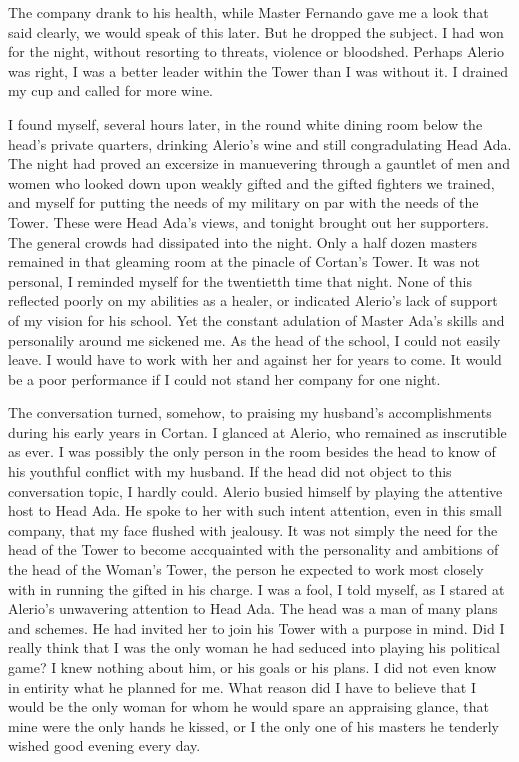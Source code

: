 \documentclass{article}
\begin{document}
The company drank to his health, while Master Fernando gave me a look that said clearly, we would speak of this later. But he dropped the subject. I had won for the night, without resorting to threats, violence or bloodshed. Perhaps Alerio was right, I was a better leader within the Tower than I was without it. I drained my cup and called for more wine.

\vspace{.5cm}

I found myself, several hours later, in the round white dining room below the head's private quarters, drinking Alerio's wine and still congradulating Head Ada. The night had proved an excersize in manuevering through a gauntlet of men and women who looked down upon weakly gifted and the gifted fighters we trained, and myself for putting the needs of my military on par with the needs of the Tower. These were Head Ada's views, and tonight brought out her supporters. The general crowds had dissipated into the night. Only a half dozen masters remained in that gleaming room at the pinacle of Cortan's Tower. It was not personal, I reminded myself for the twentietth time that night. None of this reflected poorly on my abilities as a healer, or indicated Alerio's lack of support of my vision for his school. Yet the constant adulation of Master Ada's skills and personalily around me sickened me. As the head of the school, I could not easily leave. I would have to work with her and against her for years to come. It would be a poor performance if I could not stand her company for one night.

The conversation turned, somehow, to praising my husband's accomplishments during his early years in Cortan. I glanced at Alerio, who remained as inscrutible as ever. I was possibly the only person in the room besides the head to know of his youthful conflict with my husband. If the head did not object to this conversation topic, I hardly could. Alerio busied himself by playing the attentive host to Head Ada. He spoke to her with such intent attention, even in this small company, that my face flushed with jealousy. It was not simply the need for the head of the Tower to become accquainted with the personality and ambitions of the head of the Woman's Tower, the person he expected to work most closely with in running the gifted in his charge. I was a fool, I told myself, as I stared at Alerio's unwavering attention to Head Ada. The head was a man of many plans and schemes. He had invited her to join his Tower with a purpose in mind. Did I really think that I was the only woman he had seduced into playing his political game? I knew nothing about him, or his goals or his plans. I did not even know in entirity what he planned for me. What reason did I have to believe that I would be the only woman for whom he would spare an appraising glance, that mine were the only hands he kissed, or I the only one of his masters he tenderly wished good evening every day.
\end{document}
